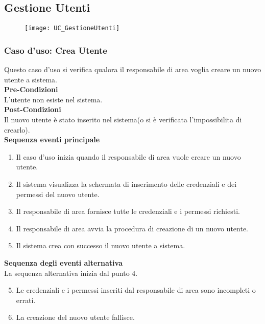 \documentclass[green, fancy, 11pt]{elegantbook}
\begin{document}
\subsection{Gestione Utenti}
\begin{figure}[H]
	\texttt{[image: UC\_GestioneUtenti]}
\end{figure}

\subsubsection{Caso d'uso: Crea Utente}
\noindent
Questo caso d’uso si verifica qualora il responsabile di area voglia creare un nuovo utente a sistema.\\
\textbf{Pre-Condizioni}\\
L’utente non esiste nel sistema.\\
\textbf{Post-Condizioni}\\
Il nuovo utente è stato inserito nel sistema(o si è verificata l’impossibilita di crearlo).\\
\textbf{Sequenza eventi principale}\\
\begin{enumerate}
	\item Il caso d’uso inizia quando il responsabile di area vuole creare un nuovo utente.
	\item Il sistema visualizza la schermata di inserimento delle credenziali e dei permessi del nuovo utente.
	\item Il responsabile di area fornisce tutte le credenziali e i permessi richiesti.
	\item Il responsabile di area avvia la procedura di creazione di un nuovo utente.
	\item Il sistema crea con successo il nuovo utente a sistema.
\end{enumerate}
\textbf{Sequenza degli eventi alternativa}\\
La sequenza alternativa inizia dal punto 4.
\begin{enumerate}
	\setcounter{enumi}{4}
	\item Le credenziali e i permessi inseriti dal responsabile di area sono incompleti o errati.
	\item La creazione del nuovo utente fallisce.
\end{enumerate}
\newpage
\end{document}
